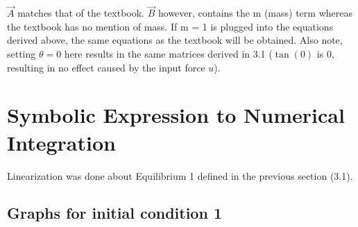 \documentclass[10pt]{article}
\begin{document}
$\vec{A}$ matches that of the textbook. $\vec{B}$ however, contains the m (mass) term whereas the textbook has no mention of mass. If m = 1 is plugged into the equations derived above, the same equations as the textbook will be obtained. Also note, setting $\theta = 0$ here results in the same matrices derived in 3.1 ($\tan(0)$ is 0, resulting in no effect caused by the input force $u$).

\section{Symbolic Expression to Numerical Integration}
Linearization was done about Equilibrium 1 defined in the previous section (3.1).

\subsection{Graphs for initial condition 1}
\end{document}
